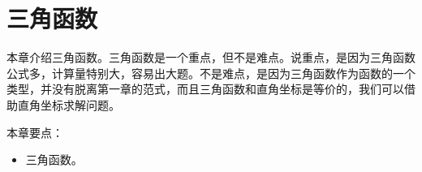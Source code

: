 \chapter{三角函数}

本章介绍三角函数。三角函数是一个重点，但不是难点。说重点，是因为三角函数公式多，计算量特别大，容易出大题。不是难点，是因为三角函数作为函数的一个类型，并没有脱离第一章的范式，而且三角函数和直角坐标是等价的，我们可以借助直角坐标求解问题。

本章要点：
\begin{itemize}
    \item 三角函数。
\end{itemize}

\newpage


\newpage


\newpage


\newpage


\newpage


\newpage


\newpage


\newpage





